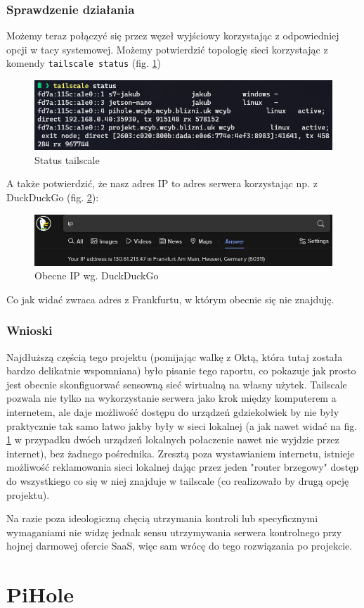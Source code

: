 \documentclass{report}
\numberwithin{equation}{section}
\begin{document}
\subsection{Sprawdzenie działania}
Możemy teraz połączyć się przez węzeł wyjściowy korzystając z odpowiedniej opcji w tacy systemowej. Możemy potwierdzić topologię sieci korzystając z komendy \texttt{tailscale status} (fig. \ref{fig:tailscale_status})
\begin{figure}[H]
    \centering
    \includegraphics[scale=1]{tailscale-status.png}
    \caption{Status tailscale}
    \label{fig:tailscale_status}
\end{figure}
\begin{samepage}
A także potwierdzić, że nasz adres IP to adres serwera korzystając np. z DuckDuckGo (fig. \ref{fig:ip_check}):
\begin{figure}[H]
    \centering
    \includegraphics[scale=0.5]{ddg-ip.png}
    \caption{Obecne IP wg. DuckDuckGo}
    \label{fig:ip_check}
\end{figure}
Co jak widać zwraca adres z Frankfurtu, w którym obecnie się nie znajduję.
\end{samepage}
\subsection{Wnioski}
Najdłuższą częścią tego projektu (pomijając walkę z Oktą, która tutaj została bardzo delikatnie wspomniana) było pisanie tego raportu, co pokazuje jak prosto jest obecnie skonfiguorwać sensowną sieć wirtualną na własny użytek. Tailscale pozwala nie tylko na wykorzystanie serwera jako krok między komputerem a internetem, ale daje możliwość dostępu do urządzeń gdziekolwiek by nie były praktycznie tak samo łatwo jakby były w sieci lokalnej (a jak nawet widać na fig. \ref{fig:tailscale_status} w przypadku dwóch urządzeń lokalnych połaczenie nawet nie wyjdzie przez internet), bez żadnego pośrednika. Zresztą poza wystawianiem internetu, istnieje możliwość reklamowania sieci lokalnej dając przez jeden "router brzegowy" dostęp do wszystkiego co się w niej znajduje w tailscale (co realizowało by drugą opcję projektu).

Na razie poza ideologiczną chęcią utrzymania kontroli lub specyficznymi wymaganiami nie widzę jednak sensu utrzymywania serwera kontrolnego przy hojnej darmowej ofercie SaaS, więc sam wrócę do tego rozwiązania po projekcie.
\chapter{PiHole}
\label{chap:pihole}
\end{document}
